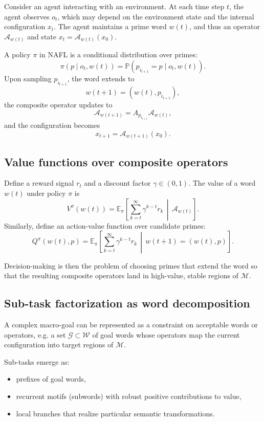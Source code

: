\documentclass[11pt]{article}
\newcommand{\Mcal}{\mathcal{M}}
\newcommand{\Acal}{\mathcal{A}}
\newcommand{\E}{\mathbb{E}}
\newcommand{\Prob}{\mathbb{P}}
\newcommand{\Awt}{\Acal_{w(t)}}
\newcommand{\Awp}{\Acal_{w(t+1)}}
\begin{document}
Consider an agent interacting with an environment.
At each time step \(t\), the agent observes \(o_t\), which may depend on the environment state and the internal configuration \(x_t\).
The agent maintains a prime word \(w(t)\), and thus an operator \(\Awt\) and state \(x_t = \Awt(x_0)\).

A policy \(\pi\) in NAFL is a conditional distribution over primes:
\[
\pi(p \mid o_t, w(t)) = \Prob(p_{i_{t+1}} = p \mid o_t, w(t)).
\]
Upon sampling \(p_{i_{t+1}}\), the word extends to
\[
w(t+1) = (w(t), p_{i_{t+1}}),
\]
the composite operator updates to
\[
\Awp = A_{p_{i_{t+1}}} \Awt,
\]
and the configuration becomes
\[
x_{t+1} = \Awp(x_0).
\]

\subsection{Value functions over composite operators}

Define a reward signal \(r_t\) and a discount factor \(\gamma \in (0,1)\).
The value of a word \(w(t)\) under policy \(\pi\) is
\[
V^\pi(w(t)) = \E_\pi\left[ \sum_{k=t}^{\infty} \gamma^{k-t} r_k \,\middle|\, \Awt \right].
\]
Similarly, define an action-value function over candidate primes:
\[
Q^\pi(w(t), p) = \E_\pi\left[ \sum_{k=t}^{\infty} \gamma^{k-t} r_k \,\middle|\, w(t+1) = (w(t), p) \right].
\]

Decision-making is then the problem of choosing primes that extend the word so that the resulting composite operators land in high-value, stable regions of \(\Mcal\).

\subsection{Sub-task factorization as word decomposition}

A complex macro-goal can be represented as a constraint on acceptable words or operators, e.g. a set \(\mathscr{G} \subset \mathscr{W}\) of goal words whose operators map the current configuration into target regions of \(\Mcal\).

Sub-tasks emerge as:
\begin{itemize}[nosep]
    \item prefixes of goal words,
    \item recurrent motifs (subwords) with robust positive contributions to value,
    \item local branches that realize particular semantic transformations.
\end{itemize}
\end{document}
